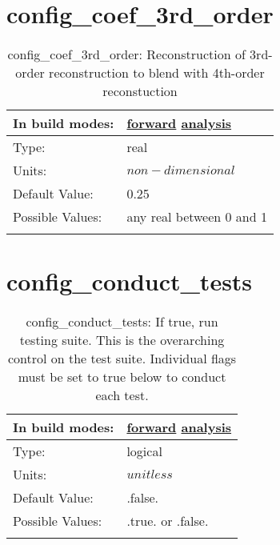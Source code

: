 \section[config\_coef\_3rd\_order]{config\_coef\_3rd\_order}
\label{sec:nm_sec_config_coef_3rd_order}
\begin{center}
\begin{longtable}{| p{2.0in} || p{4.0in} |}
    \hline
    In build modes: & \hyperref[subsec:forward_nm_tab_advection]{forward} \hyperref[subsec:analysis_nm_tab_advection]{analysis} \\
    \hline
    Type: & real \\
    \hline
    Units: & $non-dimensional$ \\
    \hline
    Default Value: & 0.25 \\
    \hline
    Possible Values: & any real between 0 and 1 \\
    \hline
    \caption{config\_coef\_3rd\_order: Reconstruction of 3rd-order reconstruction to blend with 4th-order reconstuction}
\end{longtable}
\end{center}
\section[config\_conduct\_tests]{config\_conduct\_tests}
\label{sec:nm_sec_config_conduct_tests}
\begin{center}
\begin{longtable}{| p{2.0in} || p{4.0in} |}
    \hline
    In build modes: & \hyperref[subsec:forward_nm_tab_testing]{forward} \hyperref[subsec:analysis_nm_tab_testing]{analysis} \\
    \hline
    Type: & logical \\
    \hline
    Units: & $unitless$ \\
    \hline
    Default Value: & .false. \\
    \hline
    Possible Values: & .true. or .false. \\
    \hline
    \caption{config\_conduct\_tests: If true, run testing suite.  This is the overarching control on the test suite.  Individual flags must be set to true below to conduct each test.}
\end{longtable}
\end{center}
